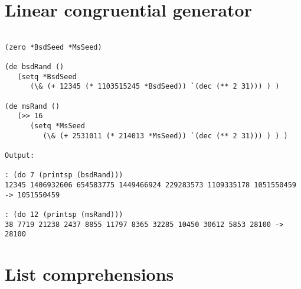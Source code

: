 \section*{Linear congruential generator}

\begin{verbatim}

(zero *BsdSeed *MsSeed)

(de bsdRand ()
   (setq *BsdSeed
      (\& (+ 12345 (* 1103515245 *BsdSeed)) `(dec (** 2 31))) ) )

(de msRand ()
   (>> 16
      (setq *MsSeed
         (\& (+ 2531011 (* 214013 *MsSeed)) `(dec (** 2 31))) ) ) )

Output:

: (do 7 (printsp (bsdRand)))
12345 1406932606 654583775 1449466924 229283573 1109335178 1051550459 -> 1051550459

: (do 12 (printsp (msRand)))
38 7719 21238 2437 8855 11797 8365 32285 10450 30612 5853 28100 -> 28100

\end{verbatim}

\section*{List comprehensions}

